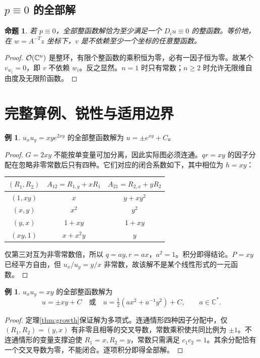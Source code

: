 \documentclass[UTF8,11pt,a4paper,fontset=fandol]{ctexart}
\newtheorem{proposition}[theorem]{命题}
\theoremstyle{definition}\newtheorem{definition}[theorem]{定义}
\newtheorem{example}[theorem]{例}
\theoremstyle{remark}\newtheorem{remark}[theorem]{注}
\newcommand{\C}{\mathbb C}\newcommand{\N}{\mathbb N}
\begin{document}
\subsection{\texorpdfstring{$p\equiv0$}{p=0} 的全部解}\label{sec:zero}
\begin{proposition}
若 $p\equiv0$，全部整函数解恰为至少满足一个 $D_i u\equiv0$ 的整函数。等价地，在 $w=A^{-T}z$ 坐标下，$v$ 是不依赖至少一个坐标的任意整函数。
\end{proposition}
\begin{proof}
$\OO(\C^n)$ 是整环，有限个整函数的乘积恒为零，必有一因子恒为零。故某个 $v_{w_i}=0$，即 $v$ 不依赖 $w_i$。反之显然。$n=1$ 时只有常数；$n\ge2$ 时允许无限维自由度及无限阶函数。
\end{proof}

\section{完整算例、锐性与适用边界}
\begin{example}\label{ex:xyexp}
$u_xu_y=xy e^{2xy}$ 的全部整函数解为 $u=\pm e^{xy}+C$。
\end{example}
\begin{proof}
$G=2xy$ 不能按单变量可加分离，因此实际图必须连通。$qr=xy$ 的因子分配在忽略非零常数后只有四种。它们对应的闭合系数如下，其中相位为 $h=xy$：
\begin{center}
\begin{tabular}{ccc}
\toprule
$(R_1,R_2)$ & $A_{12}=R_{1,y}+xR_1$ & $A_{21}=R_{2,x}+yR_2$\\
\midrule
$(1,xy)$ & $x$ & $y+xy^2$\\
$(x,y)$ & $x^2$ & $y^2$\\
$(y,x)$ & $1+xy$ & $1+xy$\\
$(xy,1)$ & $x+x^2y$ & $y$\\
\bottomrule
\end{tabular}
\end{center}
仅第三对互为非零常数倍，所以 $q=ay,r=ax$，$a^2=1$。积分即得结论。$P=xy$ 已经平方自由，但 $u_x/u_y=y/x$ 非常数，故该解不是某个线性形式的一元函数。
\end{proof}

\begin{example}
$u_xu_y=xy$ 的全部整函数解为
\[
u=\pm xy+C\quad\text{或}\quad
u=\tfrac12(ax^2+a^{-1}y^2)+C,\qquad a\in\C^*.
\]
\end{example}
\begin{proof}
定理\ref{thm:growth}保证解为多项式。连通情形四种因子分配中，仅 $(R_1,R_2)=(y,x)$ 有非零且相等的交叉导数，常数乘积使共同比例为 $\pm1$。不连通情形的变量支撑迫使 $R_1=x,R_2=y$，常数只需满足 $c_1c_2=1$。其余分配恰有一个交叉导数为零，不能闭合。逐项积分即得全部解。
\end{proof}
\end{document}
